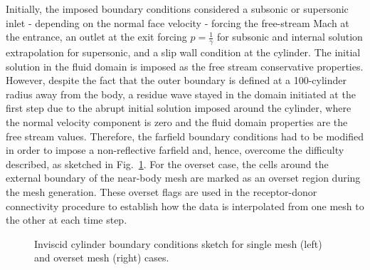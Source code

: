 Initially, the imposed boundary conditions considered a subsonic or supersonic inlet - depending on the normal face velocity - forcing the free-stream Mach at the entrance, an outlet at the exit forcing $p=\frac{1}{\gamma}$ for subsonic and internal solution extrapolation for supersonic, and a slip wall condition at the cylinder. The initial solution in the fluid domain is imposed as the free stream conservative properties. However, despite the fact that the outer boundary is defined at a 100-cylinder radius away from the body, a residue wave stayed in the domain initiated at the first step due to the abrupt initial solution imposed around the cylinder, where the normal velocity component is zero and the fluid domain properties are the free stream values. Therefore, the farfield boundary conditions had to be modified in order to impose a non-reflective farfield and, hence, overcome the difficulty described, as sketched in Fig.\ \ref{fig:cylinder_boundary_conditions}. For the overset case, the cells around the external boundary of the near-body mesh are marked as an overset region during the mesh generation. These overset flags are used in the receptor-donor connectivity procedure to establish how the data is interpolated from one mesh to the other at each time step.

 \begin{figure}[H]
	\centering
    \caption{Inviscid cylinder boundary conditions sketch for single mesh (left) and overset mesh (right) cases.}
    \label{fig:cylinder_boundary_conditions}
\end{figure}
%


